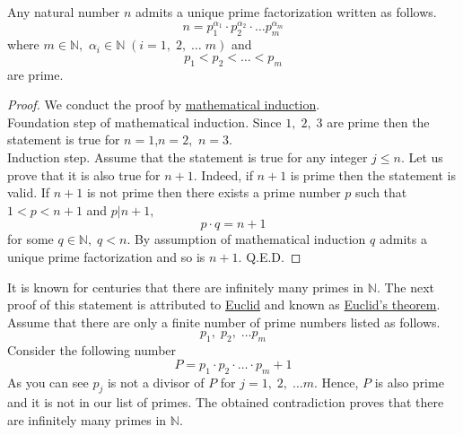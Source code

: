 \documentclass[color=black,11pt]{elegantpaper}
\begin{document}
\begin{theorem}
\label{th:prime_factorization}
Any natural number $n$ admits a unique prime factorization written as follows.
$$
n = p_1^{\alpha_1}\cdot p_2^{\alpha_2}\cdot \dots p_m^{\alpha_m}
$$
where $m\in \mathbb{N},$ $\alpha_i \in \mathbb{N}\;(i=1,\;2,\;\dots\;m)$ and 
$$
p_1 < p_2< \dots < p_m
$$
are prime. 
\end{theorem}
\begin{proof}
We conduct the proof by \href{https://en.wikipedia.org/wiki/Mathematical_induction}{mathematical induction}.\\
Foundation step of mathematical induction. Since $1,\;2,\;3$ are prime then the statement is true for $n=1$,\;$n=2,$ $n=3.$\\
Induction step. Assume that the statement is true for any integer $j\le n.$ Let us prove that it is also true for $n+1.$ Indeed, if $n+1$ is prime then the statement is valid. If $n+1$ is not prime then there exists a prime number $p$ such that $1<p<n+1$ and $p|n+1,$
$$
p\cdot q = n+1
$$ 
for some $q\in \mathbb{N}, \;q<n.$ By assumption of mathematical induction $q$ admits a unique prime factorization and so is $n+1.$  
Q.E.D.
\vspace{0.1cm}
\end{proof}
It is known for centuries that there are infinitely many primes in $\mathbb{N}.$ The next proof of this statement is attributed to \href{https://en.wikipedia.org/wiki/Euclid}{Euclid} and known as \href{https://en.wikipedia.org/wiki/Euclid's_theorem}{Euclid's theorem}.\\

Assume that there are only a finite number of prime numbers listed as follows.
$$
p_1,\;p_2,\;\dots p_m
$$
Consider the following number
$$
P=p_1 \cdot p_2 \cdot \dots \cdot p_m + 1
$$
As you can see $p_j$ is not a divisor of  $P$ for $j=1,\;2,\;\dots m.$ Hence, $P$ is also prime and it is not in our list of primes. The obtained contradiction proves that there are infinitely many primes in $\mathbb{N}.$ 

\end{document}

